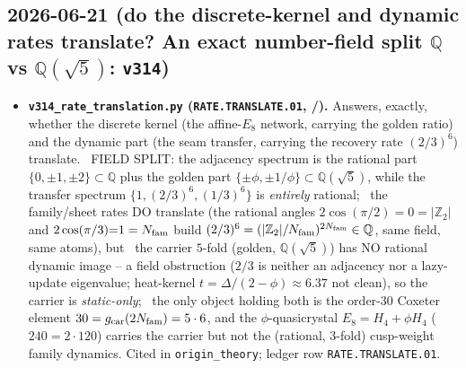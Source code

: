 \subsection*{2026-06-21 (do the discrete-kernel and dynamic rates translate? An exact number-field split $\mathbb Q$ vs $\mathbb Q(\sqrt5)$: \texttt{v314})}
\begin{itemize}
\item \textbf{\texttt{v314\_rate\_translation.py} (\texttt{RATE.TRANSLATE.01}, \mE/\mC).} Answers, exactly, whether
  the discrete kernel (the affine-$E_8$ network, carrying the golden ratio) and the dynamic part (the seam transfer,
  carrying the recovery rate $(2/3)^6$) translate. \mE\ FIELD SPLIT: the adjacency spectrum is the rational part
  $\{0,\pm1,\pm2\}\subset\mathbb Q$ plus the golden part $\{\pm\phi,\pm1/\phi\}\subset\mathbb Q(\sqrt5)$, while the
  transfer spectrum $\{1,(2/3)^6,(1/3)^6\}$ is \emph{entirely} rational; \mE\ the family/sheet rates DO translate
  (the rational angles $2\cos(\pi/2){=}0=|\mathbb Z_2|$ and $2\cos(\pi/3){=}1=N_{\mathrm{fam}}$ build
  $(2/3)^6=(|\mathbb Z_2|/N_{\mathrm{fam}})^{2N_{\mathrm{fam}}}\in\mathbb Q$, same field, same atoms), but \mE\ the carrier $5$-fold
  (golden, $\mathbb Q(\sqrt5)$) has NO rational dynamic image -- a field obstruction ($2/3$ is neither an adjacency
  nor a lazy-update eigenvalue; heat-kernel $t=\Delta/(2-\phi)\approx6.37$ not clean), so the carrier is
  \emph{static-only}; \mE\ the only object holding both is the order-$30$ Coxeter element
  $30=g_{\mathrm{car}}(2N_{\mathrm{fam}})=5\cdot6$, and the $\phi$-quasicrystal $E_8=H_4{+}\phi H_4$ ($240=2\cdot120$) carries the carrier
  but not the (rational, $3$-fold) cusp-weight family dynamics. Cited in \texttt{origin\_theory}; ledger row
  \texttt{RATE.TRANSLATE.01}.
\end{itemize}

